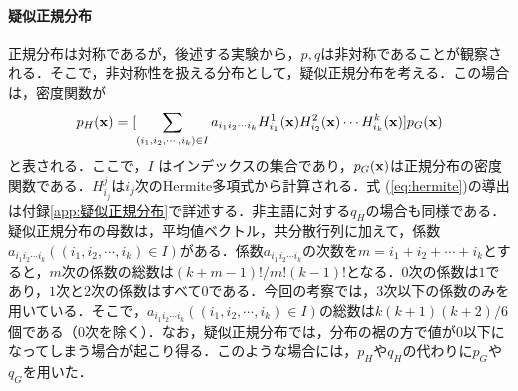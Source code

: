 \paragraph{疑似正規分布}
正規分布は対称であるが，後述する実験から，$p,q$は非対称であることが観察される．そこで，非対称性を扱える分布として，疑似正規分布を考える．この場合は，密度関数が
\begin{equation}
 p_{H}({\bf x})=[\sum_{(i_{1},i_{2},\cdots,i_{k})\in I}
       a_{i_{1}i_{2} \cdots i_{k}}
       H^{1}_{i_{1}}({\bf x}) H^{2}_{i_{2}}({\bf x}) \cdots
       H^{k}_{i_{k}}({\bf x})] p_{G}({\bf x})
       \label{eq:hermite}
\end{equation}
と表される．ここで，$I$ はインデックスの集合であり，$p_{G}({\bf x})$は正規分布の密度関数である．$H^{j}_{i_{j}}$は$i_{j}$次のHermite多項式から計算される．式 (\ref{eq:hermite})の導出は付録\ref{app:疑似正規分布}で詳述する．非主語に対する$q_{H}$の場合も同様である．疑似正規分布の母数は，平均値ベクトル，共分散行列に加えて，係数$a_{i_{1}i_{2}\cdots i_{k}} ((i_{1},i_{2},\cdots ,i_{k})\in I)$がある．係数$a_{i_{1}i_{2}\cdots i_{k}}$の次数を$m=i_{1}+i_{2}+\cdots +i_{k}$とすると，$m$次の係数の総数は$(k+m-1)!/m!(k-1)!$となる．$0$次の係数は$1$であり，$1$次と$2$次の係数はすべて$0$である．今回の考察では，$3$次以下の係数のみを用いている．そこで，$a_{i_{1}i_{2}\cdots i_{k}} ((i_{1},i_{2},\cdots ,i_{k})\in I)$の総数は$k(k+1)(k+2)/6$個である（$0$次を除く）．なお，疑似正規分布では，分布の裾の方で値が$0$以下になってしまう場合が起こり得る．このような場合には，$p_{H}$や$q_{H}$の代わりに$p_{G}$や$q_{G}$を用いた．

